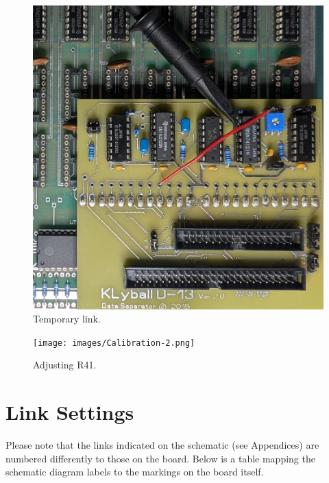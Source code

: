 \begin{figure}[htbp]
\begin{center}
\includegraphics[width=4.9in]{images/Calibration-1.jpg}
\caption{Temporary link.}
\label{fig:calibration-1}
\end{center}
\end{figure}


\begin{figure}[htbp]
\begin{center}
\texttt{[image: images/Calibration-2.png]}
\caption{Adjusting R41.}
\label{fig:calibration-2}
\end{center}
\end{figure}

\section{Link Settings}

Please note that the links indicated on the schematic (see Appendices) are numbered differently to those on the board. Below is a table mapping the schematic diagram labels to the markings on the board itself.

